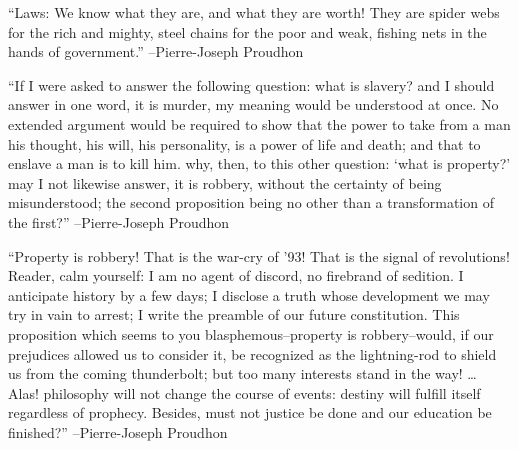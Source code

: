 \documentclass{article}%
\begin{document}
\linebreak%
\vspace{1mm}%
\begin{minipage}{\textwidth}%
\flushleft%
“Laws: We know what they are, and what they are worth! They are spider webs for the rich and mighty, steel chains for the poor and weak, fishing nets in the hands of government.”%
\linebreak%
\vspace{1mm}%
–Pierre{-}Joseph Proudhon%
\linebreak%
\vspace{1mm}%
\end{minipage}%
\linebreak%
\vspace{1mm}%
\begin{minipage}{\textwidth}%
\flushleft%
“If I were asked to answer the following question: what is slavery? and I should answer in one word, it is murder, my meaning would be understood at once. No extended argument would be required to show that the power to take from a man his thought, his will, his personality, is a power of life and death; and that to enslave a man is to kill him. why, then, to this other question: ‘what is property?’ may I not likewise answer, it is robbery, without the certainty of being misunderstood; the second proposition being no other than a transformation of the first?”%
\linebreak%
\vspace{1mm}%
–Pierre{-}Joseph Proudhon%
\linebreak%
\vspace{1mm}%
\end{minipage}%
\linebreak%
\vspace{1mm}%
\begin{minipage}{\textwidth}%
\flushleft%
“Property is robbery! That is the war{-}cry of '93! That is the signal of revolutions! Reader, calm yourself: I am no agent of discord, no firebrand of sedition. I anticipate history by a few days; I disclose a truth whose development we may try in vain to arrest; I write the preamble of our future constitution. This proposition which seems to you blasphemous–property is robbery–would, if our prejudices allowed us to consider it, be recognized as the lightning{-}rod to shield us from the coming thunderbolt; but too many interests stand in the way! … Alas! philosophy will not change the course of events: destiny will fulfill itself regardless of prophecy. Besides, must not justice be done and our education be finished?”%
\linebreak%
\vspace{1mm}%
–Pierre{-}Joseph Proudhon%
\linebreak%
\vspace{1mm}%
\end{minipage}%
\end{document}
